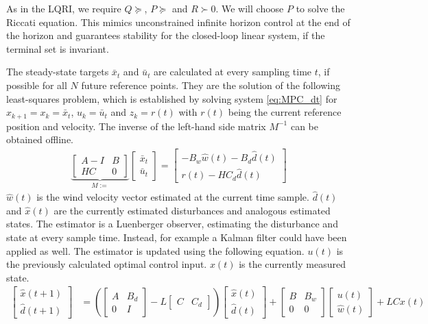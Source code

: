 As in the LQRI, we require $Q\succeq$, $P\succeq$ and $R\succ0$. We will choose $P$ to solve the Riccati equation. This mimics unconstrained infinite horizon control at the end of the horizon and guarantees stability for the closed-loop linear system, if the terminal set is invariant.

The steady-state targets $\bar{x}_t$ and $\bar{u}_t$ are calculated at every sampling time $t$, if possible for all $N$ future reference points. They are the solution of the following least-squares problem, which is established by solving system \ref{eq:MPC_dt} for $x_{k+1}=x_k=\bar{x}_t$, $u_k = \bar{u}_t$ and $z_k = r(t)$ with $r(t)$ being the current reference position and velocity. The inverse of the left-hand side matrix $M^{-1}$ can be obtained offline.
\begin{align}
\underbrace{\begin{bmatrix}
A-I & B \\
HC & 0 
\end{bmatrix}}_{M:=}
\begin{bmatrix}
\bar{x}_t \\
\bar{u}_t
\end{bmatrix}
=
\begin{bmatrix}
-B_w \hat{w}(t) - B_d \hat{d}(t)\\
r(t) - H C_d \hat{d}(t) \label{eq:steady_state_ls}
\end{bmatrix}
\end{align}
$\hat{w}(t)$ is the wind velocity vector estimated at the current time sample. $\hat{d}(t)$ and $\hat x (t)$ are the currently estimated disturbances and analogous estimated states. The estimator is a Luenberger observer, estimating the disturbance and state at every sample time. Instead, for example a Kalman filter could have been applied as well. The estimator is updated using the following equation. $u(t)$ is the previously calculated optimal control input. $x(t)$ is the currently measured state.
\begin{align}
\begin{bmatrix}
\hat{x}(t+1) \\ \hat{d}(t+1)
\end{bmatrix}
&=\left(
\begin{bmatrix}
A & B_d \\
0 & I
\end{bmatrix}
- L
\begin{bmatrix}
C & C_d
\end{bmatrix}
\right) \begin{bmatrix}
\hat{x}(t) \\ \hat{d}(t)
\end{bmatrix}
+
\begin{bmatrix}
B & B_w \\
0 & 0
\end{bmatrix}
\begin{bmatrix}
u(t) \\ \hat{w}(t)
\end{bmatrix}
+
L C x(t) \label{eq:mpc_obsv_update}
\end{align}

